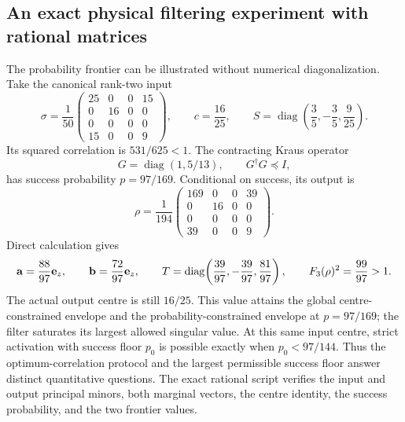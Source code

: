 \subsection{An exact physical filtering experiment with rational matrices}
The probability frontier can be illustrated without numerical diagonalization.
Take the canonical rank-two input
\[
 \sigma=\frac1{50}
 \begin{pmatrix}25&0&0&15\\0&16&0&0\\0&0&0&0\\15&0&0&9\end{pmatrix},
 \qquad c=\frac{16}{25},\qquad
 S=\operatorname{diag}\!\left(\frac35,-\frac35,\frac9{25}\right).
\]
Its squared correlation is $531/625<1$. The contracting Kraus operator
\[
 G=\operatorname{diag}(1,5/13),\qquad G^\dagger G\preceq I,
\]
has success probability $p=97/169$. Conditional on success, its output is
\[
 \rho=\frac1{194}
 \begin{pmatrix}169&0&0&39\\0&16&0&0\\0&0&0&0\\39&0&0&9\end{pmatrix}.
\]
Direct calculation gives
\[
 \mathbf a=\frac{88}{97}\mathbf e_z,\qquad
 \mathbf b=\frac{72}{97}\mathbf e_z,\qquad
 T=\operatorname{diag}\!\left(\frac{39}{97},-\frac{39}{97},\frac{81}{97}\right),
 \qquad F_3(\rho)^2=\frac{99}{97}>1.
\]
The actual output centre is still $16/25$. This value attains the global
centre-constrained envelope and the probability-constrained envelope at
$p=97/169$; the filter saturates its largest allowed singular value.
At this same input centre, strict activation with success floor $p_0$ is
possible exactly when $p_0<97/144$. Thus the optimum-correlation protocol
and the largest permissible success floor answer distinct quantitative
questions. The exact rational script
 verifies the input and output
principal minors, both marginal vectors, the centre identity, the success
probability, and the two frontier values.
